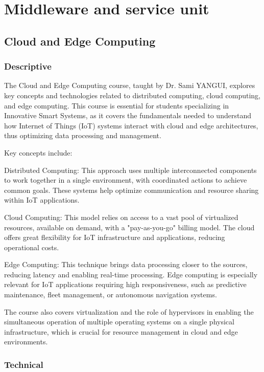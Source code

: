 \chapter{Middleware and service unit }
\thispagestyle{fancy}


\section{Cloud and Edge Computing}
\subsection{Descriptive}


The Cloud and Edge Computing course, taught by Dr. Sami YANGUI, explores key concepts and technologies related to distributed computing, cloud computing, and edge computing. This course is essential for students specializing in Innovative Smart Systems, as it covers the fundamentals needed to understand how Internet of Things (IoT) systems interact with cloud and edge architectures, thus optimizing data processing and management.

Key concepts include:

Distributed Computing: This approach uses multiple interconnected components to work together in a single environment, with coordinated actions to achieve common goals. These systems help optimize communication and resource sharing within IoT applications.

Cloud Computing: This model relies on access to a vast pool of virtualized resources, available on demand, with a "pay-as-you-go" billing model. The cloud offers great flexibility for IoT infrastructure and applications, reducing operational costs.

Edge Computing: This technique brings data processing closer to the sources, reducing latency and enabling real-time processing. Edge computing is especially relevant for IoT applications requiring high responsiveness, such as predictive maintenance, fleet management, or autonomous navigation systems.

The course also covers virtualization and the role of hypervisors in enabling the simultaneous operation of multiple operating systems on a single physical infrastructure, which is crucial for resource management in cloud and edge environments.

\subsection{Technical}

